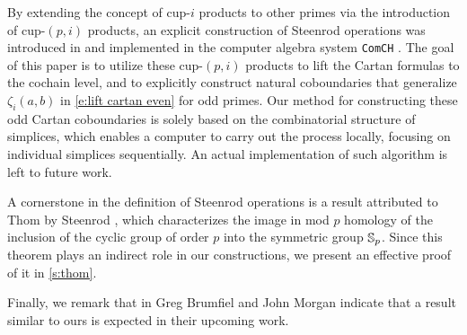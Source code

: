 By extending the concept of cup-$i$ products to other primes via the introduction of cup-$(p,i)$ products, an explicit construction of Steenrod operations was introduced in \cite{medina2021may_st} and implemented in the computer algebra system \texttt{ComCH} \cite{medina2021comch}.
The goal of this paper is to utilize these cup-$(p,i)$ products to lift the Cartan formulas to the cochain level, and to explicitly construct natural coboundaries that generalize $\zeta_i(a,b)$ in \cref{e:lift cartan even} for odd primes.
Our method for constructing these odd Cartan coboundaries is solely based on the combinatorial structure of simplices, which enables a computer to carry out the process locally, focusing on individual simplices sequentially.
An actual implementation of such algorithm is left to future work.

A cornerstone in the definition of Steenrod operations is a result attributed to Thom by Steenrod \cite{steenrod1953cyclic}, which characterizes the image in mod $p$ homology of the inclusion of the cyclic group of order $p$ into the symmetric group $\mathbb{S}_p$.
Since this theorem plays an indirect role in our constructions, we present an effective proof of it in \cref{s:thom}.

Finally, we remark that in \cite{brumfiel2023explicit} Greg Brumfiel and John Morgan indicate that a result similar to ours is expected in their upcoming work.